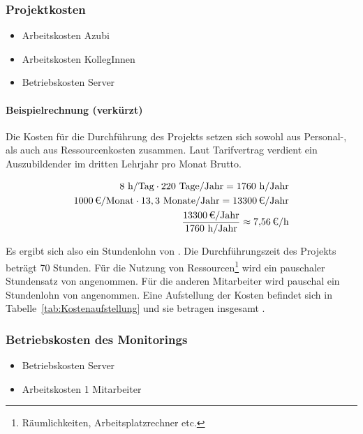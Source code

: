 \subsubsection{Projektkosten}
\label{sec:Projektkosten}
\begin{itemize}
	\item Arbeitskosten Azubi
	\item Arbeitskosten KollegInnen
	\item Betriebskosten Server
\end{itemize}

\paragraph{Beispielrechnung (verkürzt)}
Die Kosten für die Durchführung des Projekts setzen sich sowohl aus Personal-, als auch aus Ressourcenkosten zusammen.
Laut Tarifvertrag verdient ein Auszubildender im dritten Lehrjahr pro Monat  Brutto. 

\begin{eqnarray}
8 \mbox{ h/Tag} \cdot 220 \mbox{ Tage/Jahr} = 1760 \mbox{ h/Jahr}\\
\eur{1000}\mbox{/Monat} \cdot 13,3 \mbox{ Monate/Jahr} = \eur{13300} \mbox{/Jahr}\\
\frac{\eur{13300} \mbox{/Jahr}}{1760 \mbox{ h/Jahr}} \approx \eur{7,56}\mbox{/h}
\end{eqnarray}

Es ergibt sich also ein Stundenlohn von . 
Die Durchführungszeit des Projekts beträgt 70 Stunden. Für die Nutzung von Ressourcen\footnote{Räumlichkeiten, Arbeitsplatzrechner etc.} wird 
ein pauschaler Stundensatz von  angenommen. Für die anderen Mitarbeiter wird pauschal ein Stundenlohn von  angenommen. 
Eine Aufstellung der Kosten befindet sich in Tabelle~\ref{tab:Kostenaufstellung} und sie betragen insgesamt .

\subsubsection{Betriebskosten des Monitorings}
\label{sec:BetriebskostenMonitoring}
\begin{itemize}
	\item Betriebskosten Server
	\item Arbeitskosten 1 Mitarbeiter
\end{itemize}

